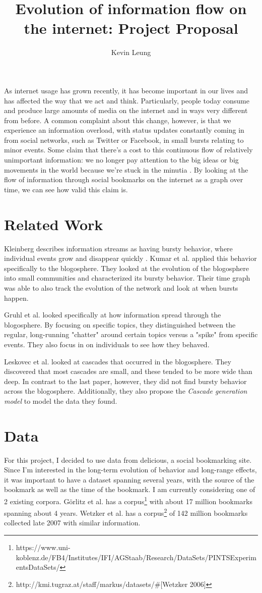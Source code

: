 \documentclass[12pt]{amsart}
\title{Evolution of information flow on the internet: Project Proposal}
\author{Kevin Leung}
\begin{document}
\maketitle
As internet usage has grown recently, it has become important in our lives and has affected the way that we act and think. Particularly, people today consume and produce large amounts of media on the internet and in ways very different from before. A common complaint about this change, however, is that we experience an information overload, with status updates constantly coming in from social networks, such as Twitter or Facebook, in small bursts relating to minor events. Some claim that there's a cost to this continuous flow of relatively unimportant information: we no longer pay attention to the big ideas or big movements in the world because we're stuck in the minutia \cite{big-idea} \cite{egypt}. By looking at the flow of information through social bookmarks on the internet as a graph over time, we can see how valid this claim is.
\section{Related Work}
Kleinberg \cite{bursty-original} describes information streams as having bursty behavior, where individual events grow and disappear quickly . Kumar et al. \cite{bursty} applied this behavior specifically to the blogosphere. They looked at the evolution of the blogosphere into small communities and characterized its bursty behavior. Their time graph was able to also track the evolution of the network and look at when bursts happen. 

Gruhl et al. \cite{gruhl} looked specifically at how information spread through the blogosphere. By focusing on specific topics, they distinguished between the regular, long-running "chatter" around certain topics versus a "spike" from specific events. They also focus in on individuals to see how they behaved.

Leskovec et al. \cite{cascade} looked at cascades that occurred in the blogosphere. They discovered that most cascades are small, and these tended to be more wide than deep. In contrast to the last paper, however, they did not find bursty behavior across the blogosphere. Additionally, they also propose the \textit{Cascade generation model} to model the data they found.
\section{Data}
For this project, I decided to use data from delicious, a social bookmarking site. Since I'm interested in the long-term evolution of behavior and long-range effects, it was important to have a dataset spanning several years, with the source of the bookmark as well as the time of the bookmark. I am currently considering one of 2 existing corpora. G\"orlitz et al. \cite{goerlitz} has a corpus\footnote[1]{https://www.uni-koblenz.de/FB4/Institutes/IFI/AGStaab/Research/DataSets/PINTSExperimentsDataSets/} with about 17 million bookmarks spanning about 4 years. Wetzker et al. \cite{wetzker} has a corpus\footnote[2]{http://kmi.tugraz.at/staff/markus/datasets/\#[Wetzker 2006]} of 142 million bookmarks collected late 2007 with similar information. 
\end{document}
